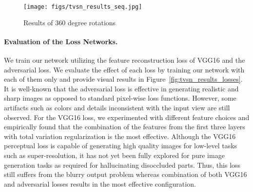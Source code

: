 \documentclass[10pt,twocolumn,letterpaper]{article}
\begin{document}

\begin{figure*}[t]
\vspace{-2mm}
\begin{center}
\texttt{[image: figs/tvsn\_results\_seq.jpg]}
\end{center}
\caption{Results of 360 degree rotations}
\label{fig:tvsn_results_seq}
\vspace{-2mm}
\end{figure*}


\vspace{-3mm}
\paragraph{Evaluation of the Loss Networks.} We train our network utilizing the feature reconstruction loss of VGG16 and the adversarial loss. We evaluate the effect of each loss by training our network with each of them only and provide visual results in Figure~\ref{fig:tvsn_results_losses}. It is well-known that the adversarial loss is effective in generating realistic and sharp images as opposed to standard pixel-wise loss functions. However, some artifacts such as colors and details inconsistent with the input view are still observed. For the VGG16 loss, we experimented with different feature choices and empirically found that the combination of the features from the first three layers with total variation regularization is the most effective. Although the VGG16 perceptual loss is capable of generating high quality images for low-level tasks such as super-resolution, it has not yet been fully explored for pure image generation tasks as required for hallucinating disoccluded parts. Thus, this loss still suffers from the blurry output problem whereas combination of both VGG16 and adversarial losses results in the most effective configuration.
\end{document}
